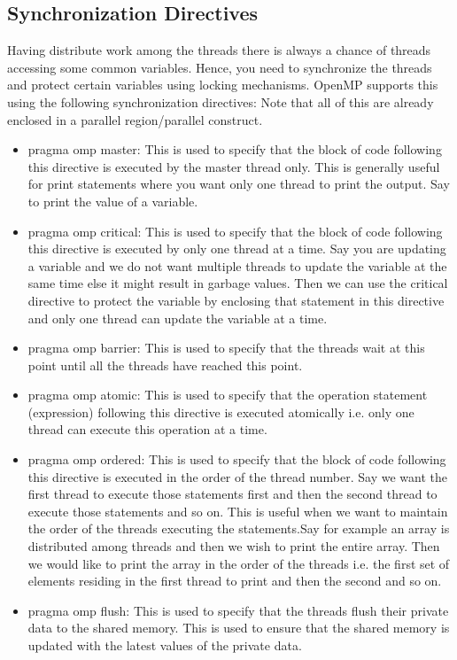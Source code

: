 \documentclass[12pt]{book}
\begin{document}
\subsection{Synchronization Directives}
Having distribute work among the threads there is always a chance of threads accessing some common variables. Hence, you need to synchronize the threads 
and protect certain variables using locking mechanisms.
OpenMP supports this using the following synchronization directives:
Note that all of this are already enclosed in a parallel region/parallel construct.
\begin{itemize}
    \item pragma omp master: This is used to specify that the block of code following this directive is executed by the master thread only.
    This is generally useful for print statements where you want only one thread to print the output. Say to print the value of a variable.
    \item pragma omp critical: This is used to specify that the block of code following this directive is executed by only one thread at a time.
    Say you are updating a variable and we do not want multiple threads to update the variable at the same time else it might result in garbage values.
    Then we can use the critical directive to protect the variable by enclosing that statement in this directive and only one thread can update the variable at a time.
    \item pragma omp barrier: This is used to specify that the threads wait at this point until all the threads have reached this point.
    \item pragma omp atomic: This is used to specify that the operation statement (expression) following this directive is executed atomically i.e. only one thread can execute this operation at a time.
    \item pragma omp ordered: This is used to specify that the block of code following this directive is executed in the order of the thread number. Say we want the first thread to execute those statements first and then the second thread to execute those statements and so on.
    This is useful when we want to maintain the order of the threads executing the statements.Say for example an array is distributed among threads and then we wish to print the entire array. Then we would like to print the array in the order of the threads i.e. the first set of elements residing in the first thread to print and then the second and so on.
    \item pragma omp flush: This is used to specify that the threads flush their private data to the shared memory. This is used to ensure that the shared memory is updated with the latest values of the private data.

\end{itemize}
\end{document}
